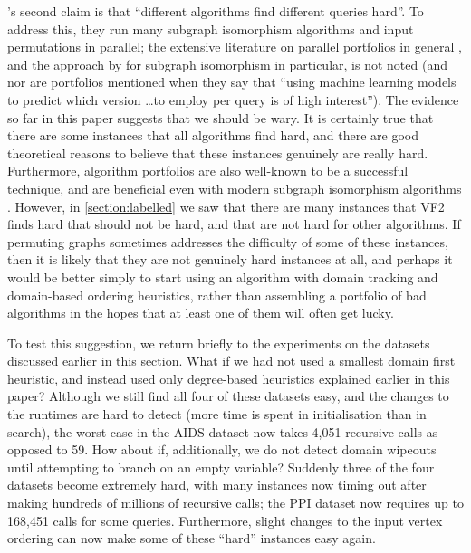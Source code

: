 \documentclass[twoside,11pt]{article}
\newcommand{\citet}[1]{\citeA{#1}}
\newcommand{\citep}[1]{\cite{#1}}
\begin{document}
\citet{DBLP:conf/edbt/KatsarouNT17}'s second claim is that ``different algorithms find different
queries hard''. To address this, they run many subgraph isomorphism algorithms and input
permutations in parallel; the extensive literature on parallel portfolios in general
\citep{DBLP:journals/ai/GomesS01}, and the approach by \citet{DBLP:conf/sls/BattitiM07} for subgraph
isomorphism in particular, is not noted (and nor are portfolios mentioned when they say that ``using
machine learning models to predict which version \ldots to employ per query is of high interest'').
The evidence so far in this paper suggests that we should be wary. It is certainly true that there
are some instances that all algorithms find hard, and there are good theoretical reasons to believe
that these instances genuinely are really hard.  Furthermore, algorithm portfolios are also
well-known to be a successful technique, and are beneficial even with modern subgraph isomorphism
algorithms \citep{DBLP:conf/lion/KotthoffMS16}.  However, in \cref{section:labelled} we saw that there
are many instances that VF2 finds hard that should not be hard, and that are not hard for other
algorithms.  If permuting graphs sometimes addresses the difficulty of some of these instances, then
it is likely that they are not genuinely hard instances at all, and perhaps it would be better
simply to start using an algorithm with domain tracking and domain-based ordering heuristics, rather
than assembling a portfolio of bad algorithms in the hopes that at least one of them will often get
lucky.

To test this suggestion, we return briefly to the experiments on the datasets discussed earlier in
this section. What if we had not used a smallest domain first heuristic, and instead used only
degree-based heuristics explained earlier in this paper? Although we still find all four of these
datasets easy, and the changes to the runtimes are hard to detect (more time is spent in
initialisation than in search), the worst case in the AIDS dataset now takes 4,051 recursive calls
as opposed to 59.  How about if, additionally, we do not detect domain wipeouts until attempting to
branch on an empty variable?  Suddenly three of the four datasets become extremely hard, with many
instances now timing out after making hundreds of millions of recursive calls; the PPI dataset now
requires up to 168,451 calls for some queries. Furthermore, slight changes to the input vertex
ordering can now make some of these ``hard'' instances easy again.
\end{document}
